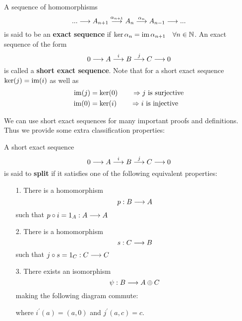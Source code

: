 \begin{definition}
  A sequence of homomorphisms
  $$ ... \longrightarrow A_{n+1} \overset{\alpha_{n+1}}{\longrightarrow} A_{n} \overset{\alpha_{n}}{\longrightarrow} A_{n-1} \longrightarrow ... $$
  is said to be an \textbf{exact sequence} if $ \ker \alpha_n = \operatorname{im} \alpha_{n+1} \quad \forall n \in \mathbb{N} $. An exact sequence of the form
  $$ 0 \longrightarrow A \overset{i}{\longrightarrow} B \overset{j}{\longrightarrow} C \longrightarrow 0 $$
  is called a \textbf{short exact sequence}. Note that for a short exact sequence $\ker(j) = \operatorname{im}(i)$ as well as
  \begin{align}
    \operatorname{im}(j) &= \ker(0) \quad \quad \Rightarrow j \ \text{is surjective}\\
    \operatorname{im}(0) &= \ker(i) \quad \quad \Rightarrow i \ \text{is injective}\\
  \end{align}
\end{definition}

We can use short exact sequences for many important proofs and definitions. Thus we provide some extra classification properties:

\begin{definition}
  A short exact sequence
  $$ 0 \longrightarrow A \overset{i}{\longrightarrow} B \overset{j}{\longrightarrow} C \longrightarrow 0 $$
  is said to \textbf{split} if it satisfies one of the following equivalent properties:
  \begin{itemize}
    \item[1.] There is a homomorphism
    $$ p:B \longrightarrow A $$
    such that $p\circ i = 1_A: A\longrightarrow A$
    \item[2.] There is a homomorphism
    $$ s:C \longrightarrow B $$
    such that $j \circ s = 1_C: C\longrightarrow C$
    \item[3.] There exists an isomorphism
    $$ \psi:B \longrightarrow A\oplus C $$
    making the following diagram commute:
    \begin{center}
    \end{center}

    where $i^\prime(a) = (a,0)$ and $j^\prime(a,c) = c$.
  \end{itemize}
\end{definition}

